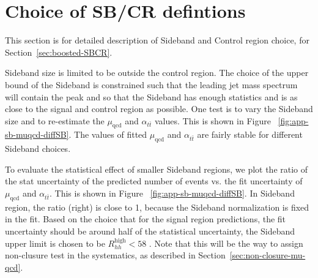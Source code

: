 \section{Choice of SB/CR defintions} %
\label{app:SB-optimization}

This section is for detailed description of Sideband and Control region choice, for Section~\ref{sec:boosted-SBCR}.

Sideband size is limited to be outside the control region. The choice of the upper bound of the Sideband is constrained such that the leading jet mass spectrum will contain the \ttbar peak and so that the Sideband has enough statistics and is as close to the signal and control region as possible. One test is to vary the Sideband size and to re-estimate the $\mu_{\text{qcd}}$ and $\alpha_{t\bar{t}}$ values. This is shown in Figure ~\ref{fig:app-sb-muqcd-diffSB}. The values of fitted $\mu_{\text{qcd}}$ and $\alpha_{t\bar{t}}$ are fairly stable for different Sideband choices.

To evaluate the statistical effect of smaller Sideband regions, we plot the ratio of the stat uncertainty of the predicted number of events vs. the fit uncertainty of $\mu_{\text{qcd}}$ and $\alpha_{t\bar{t}}$. This is shown in Figure ~\ref{fig:app-sb-muqcd-diffSB}. In Sideband region, the ratio (right) is close to 1, because the Sideband normalization is fixed in the fit. Based on the choice that for the signal region predictions, the fit uncertainty should be around half of the statistical uncertainty, the Sideband upper limit is chosen to be $R_{hh}^{\text{high}} < 58$ \GeV. Note that this will be the way to assign non-clusure test in the systematics, as described in Section~\ref{sec:non-closure-mu-qcd}.

